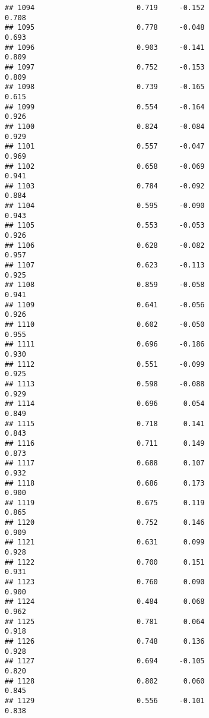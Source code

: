 \documentclass[
]{article}
\begin{document}
\begin{verbatim}
## 1094                        0.719     -0.152                     0.708
## 1095                        0.778     -0.048                     0.693
## 1096                        0.903     -0.141                     0.809
## 1097                        0.752     -0.153                     0.809
## 1098                        0.739     -0.165                     0.615
## 1099                        0.554     -0.164                     0.926
## 1100                        0.824     -0.084                     0.929
## 1101                        0.557     -0.047                     0.969
## 1102                        0.658     -0.069                     0.941
## 1103                        0.784     -0.092                     0.884
## 1104                        0.595     -0.090                     0.943
## 1105                        0.553     -0.053                     0.926
## 1106                        0.628     -0.082                     0.957
## 1107                        0.623     -0.113                     0.925
## 1108                        0.859     -0.058                     0.941
## 1109                        0.641     -0.056                     0.926
## 1110                        0.602     -0.050                     0.955
## 1111                        0.696     -0.186                     0.930
## 1112                        0.551     -0.099                     0.925
## 1113                        0.598     -0.088                     0.929
## 1114                        0.696      0.054                     0.849
## 1115                        0.718      0.141                     0.843
## 1116                        0.711      0.149                     0.873
## 1117                        0.688      0.107                     0.932
## 1118                        0.686      0.173                     0.900
## 1119                        0.675      0.119                     0.865
## 1120                        0.752      0.146                     0.909
## 1121                        0.631      0.099                     0.928
## 1122                        0.700      0.151                     0.931
## 1123                        0.760      0.090                     0.900
## 1124                        0.484      0.068                     0.962
## 1125                        0.781      0.064                     0.918
## 1126                        0.748      0.136                     0.928
## 1127                        0.694     -0.105                     0.820
## 1128                        0.802      0.060                     0.845
## 1129                        0.556     -0.101                     0.838

\end{verbatim}
\end{document}
